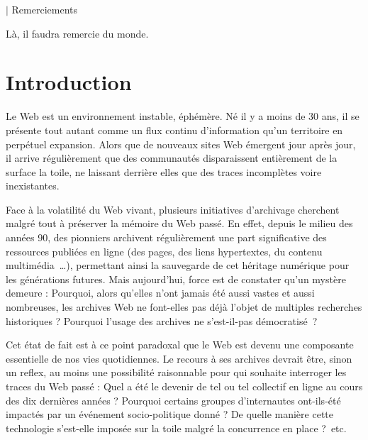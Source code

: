 \documentclass[symmetric,justified,marginals=raggedouter]{tufte-book}
\begin{document}
\newpage
\begingroup
\vspace*{8em}
\huge $\vert$ \huge Remerciements
\vspace*{4em}
\par\normalsize Là, il faudra remercie du monde.
\endgroup
\vfill


\tableofcontents




\mainmatter

\chapter*{Introduction}

\noindent Le Web est un environnement instable, éphémère. Né il y a moins de 30 ans, il se présente tout autant comme un flux continu d'information qu'un territoire en perpétuel expansion. Alors que de nouveaux sites Web émergent jour après jour, il arrive régulièrement que des communautés disparaissent entièrement de la surface la toile, ne laissant derrière elles que des traces incomplètes voire inexistantes.

Face à la volatilité du Web vivant, plusieurs initiatives d'archivage cherchent malgré tout à préserver la mémoire du Web passé. En effet, depuis le milieu des années 90, des pionniers archivent régulièrement une part significative des ressources publiées en ligne (des pages, des liens hypertextes, du contenu multimédia~\ldots{}), permettant ainsi la sauvegarde de cet héritage numérique pour les générations futures. Mais aujourd'hui, force est de constater qu'un mystère demeure : Pourquoi, alors qu'elles n'ont jamais été aussi vastes et aussi nombreuses, les archives Web ne font-elles pas déjà l'objet de multiples recherches historiques ? Pourquoi l'usage des archives ne s'est-il-pas démocratisé~?

Cet état de fait est à ce point paradoxal que le Web est devenu une composante essentielle de nos vies quotidiennes. Le recours à ses archives devrait être, sinon un reflex, au moins une possibilité raisonnable pour qui souhaite interroger les traces du Web passé : Quel a été le devenir de tel ou tel collectif en ligne au cours des dix dernières années ? Pourquoi certains groupes d'internautes ont-ils-été impactés par un événement socio-politique donné ? De quelle manière cette technologie s'est-elle imposée sur la toile malgré la concurrence en place ?~etc. 
\end{document}
